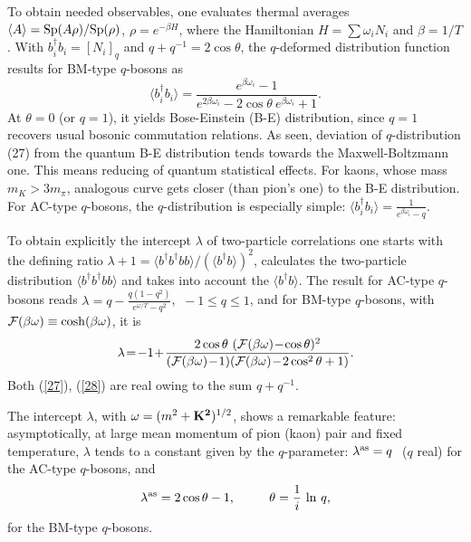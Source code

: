 \documentclass[twoside]{article}
\begin{document}
To obtain needed observables, one evaluates thermal averages
$\langle A \rangle ={\rm Sp}(A\rho )/{\rm Sp}(\rho)$,
$\rho = e^{-\beta H}$, where the Hamiltonian $H={\sum}\omega_i N_i$
and $\beta=1/T$.
%
With $b^\dagger_i b_i=[N_i]_q$ and $q+q^{-1}=2\cos\theta$,
the $q$-deformed distribution function results for BM-type $q$-bosons as
%
\vspace{-0.3mm}
\begin{equation}
\langle b_i^\dagger b_i \rangle=\frac{e^{\beta\omega_i}-1}
{e^{2\beta\omega_i}-2\cos\theta~e^{\beta\omega_i}+1} .      \label{27}
\end{equation}
\vspace{-0.3mm}
%
At $\theta{=}0$ (or $q{=}1$), it yields Bose-Einstein (B-E) distribution,
since $q{=}1$ recovers usual bosonic commutation relations.
%
As seen, deviation of $q$-distribution (27) from the quantum
B-E distribution tends towards the Maxwell-Boltzmann one.
 This means reducing of quantum statistical effects.
For kaons, whose mass $m_K>3m_{\pi}$, analogous curve gets closer
(than pion's one) to the B-E distribution.
%
For AC-type $q$-bosons, the $q$-distribution is especially simple:
$
\langle b_i^\dagger b_i \rangle=\frac{1}{e^{\beta\omega_i}-q} .
$

To obtain explicitly the intercept $\lambda$ of two-particle
correlations one starts with the defining ratio
$\lambda + 1 = \langle b^\dagger b^\dagger b b\rangle /
(\langle b^\dagger b \rangle)^2$,  calculates the two-particle
distribution $\langle b^\dagger b^\dagger b b\rangle$ and takes
into account the $\langle b^\dagger b \rangle$. 
The result for AC-type $q$-bosons reads
$\lambda=q-\frac{q(1-q^2)}{e^{\omega/T}-q^2}$, $\ -1\le q\le 1$,
and for BM-type $q$-bosons, with
${\cal F}(\beta\omega)\equiv\cosh(\beta\omega)$, it is
\begin{equation}
\lambda\!=\!-1\!+\!\frac{ 2\cos\theta\
({\cal F}(\beta\omega)\!-\!\cos\theta)^2 }
{({\cal F}(\beta\omega)\!-\!1)({\cal F}(\beta\omega)\!-\!2\cos^2\theta+1)}.
                                                           \label{28}
\end{equation}
Both (\ref{27}), (\ref{28}) are real owing to the sum $q+q^{-1}$.

The intercept $\lambda$, with $\omega=(m^2+{\bf K^2})^{1/2}$,
shows a remarkable feature: asymp\-to\-tically, at large
mean momentum of pion (kaon) pair
and fixed temperature,  $\lambda$ tends to a constant
given by the $q$-parameter: $\lambda^{\rm as}=q\ $ ($q$ real)
for the AC-type $q$-bosons, and
\vspace{-0.6mm}
\begin{equation}
\lambda^{\rm as}=2\cos\theta-1, \ \ \ \ \ \ \ \
                       \theta=\frac1i~{\rm ln}~q,       \label{(29)}
\end{equation}
\vspace{-0.4mm}
for the BM-type $q$-bosons.
\end{document}
